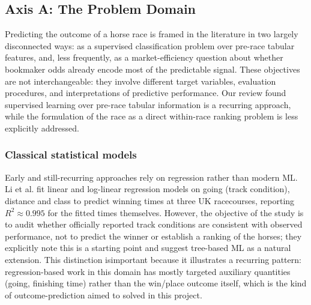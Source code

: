 \subsection{Axis A: The Problem Domain}
\label{sec:ejeA}

Predicting the outcome of a horse race is framed in the literature in two largely
disconnected ways: as a supervised classification problem over pre-race tabular
features, and, less frequently, as a market-efficiency question about whether
bookmaker odds already encode most of the predictable signal. These objectives are
not interchangeable: they involve different target variables, evaluation procedures,
and interpretations of predictive performance. Our review found supervised learning
over pre-race tabular information is a recurring approach, while the formulation of
the race as a direct within-race ranking problem is less explicitly addressed.

\subsubsection*{\textbf{Classical statistical models}}
Early and still-recurring approaches rely on
regression rather than modern ML. Li et al.\cite{ejeA_li2025} fit linear and
log-linear regression models on going (track condition), distance and class to
predict winning times at three UK racecourses, reporting $R^2 \approx 0.995$ for
the fitted times themselves. However, the objective of the study is to audit
whether officially reported track conditions are consistent with observed
performance, not to predict the winner or establish a ranking of the horses; they
explicitly note this is a starting point and suggest tree-based ML as a natural
extension. This distinction isimportant because it illustrates a recurring pattern:
regression-based work in this domain has mostly targeted auxiliary quantities
(going, finishing time) rather than the win/place outcome itself, which is the kind
of outcome-prediction aimed to solved in this project.

